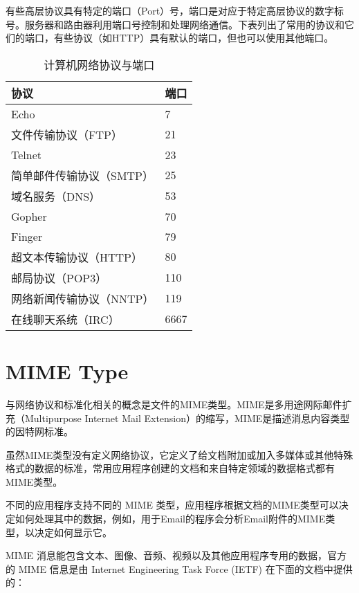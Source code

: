 有些高层协议具有特定的端口（Port）号，端口是对应于特定高层协议的数字标号。服务器和路由器利用端口号控制和处理网络通信。下表列出了常用的协议和它们的端口，有些协议（如HTTP）具有默认的端口，但也可以使用其他端口。

\begin{table}
\centering
\caption{计算机网络协议与端口}
\label{network_protocols}
\begin{tabular}{|p{150pt}|p{60pt}|}
\hline
协议						&端口\\
\hline
Echo						&7\\
\hline
文件传输协议（FTP）		&21\\
\hline
Telnet					&23\\
\hline
简单邮件传输协议（SMTP）	&25\\
\hline
域名服务（DNS）			&53\\
\hline
Gopher					&70\\
\hline
Finger					&79\\
\hline
超文本传输协议（HTTP）	&80\\
\hline
邮局协议（POP3）		&110\\
\hline
网络新闻传输协议（NNTP）	&119\\
\hline
在线聊天系统（IRC）		&6667\\
\hline
\end{tabular}
\end{table}



\section{MIME Type}

与网络协议和标准化相关的概念是文件的MIME类型。MIME是多用途网际邮件扩充（Multipurpose Internet Mail Extension）的缩写，MIME是描述消息内容类型的因特网标准。

虽然MIME类型没有定义网络协议，它定义了给文档附加或加入多媒体或其他特殊格式的数据的标准，常用应用程序创建的文档和来自特定领域的数据格式都有MIME类型。

不同的应用程序支持不同的 MIME 类型，应用程序根据文档的MIME类型可以决定如何处理其中的数据，例如，用于Email的程序会分析Email附件的MIME类型，以决定如何显示它。

MIME 消息能包含文本、图像、音频、视频以及其他应用程序专用的数据，官方的 MIME 信息是由 Internet Engineering Task Force (IETF) 在下面的文档中提供的：

